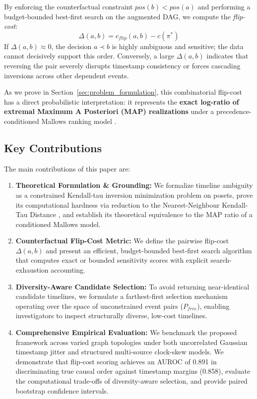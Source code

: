\documentclass[journal]{IEEEtran}
\begin{document}
By enforcing the counterfactual constraint $pos(b) < pos(a)$ and performing a budget-bounded best-first search on the augmented DAG, we compute the \emph{flip-cost}:
\begin{equation}
\Delta(a, b) = c_{flip}(a, b) - c(\pi^*)
\end{equation}
If $\Delta(a, b) \approx 0$, the decision $a \prec b$ is highly ambiguous and sensitive; the data cannot decisively support this order. Conversely, a large $\Delta(a, b)$ indicates that reversing the pair severely disrupts timestamp consistency or forces cascading inversions across other dependent events.

As we prove in Section~\ref{sec:problem_formulation}, this combinatorial flip-cost has a direct probabilistic interpretation: it represents the \textbf{exact log-ratio of extremal Maximum A Posteriori (MAP) realizations} under a precedence-conditioned Mallows ranking model \cite{Lu2011}.

\subsection{Key Contributions}
The main contributions of this paper are:
\begin{enumerate}
    \item \textbf{Theoretical Formulation \& Grounding:} We formalize timeline ambiguity as a constrained Kendall-tau inversion minimization problem on posets, prove its computational hardness via reduction to the Nearest-Neighbour Kendall-Tau Distance \cite{Brandenburg2011}, and establish its theoretical equivalence to the MAP ratio of a conditioned Mallows model.
    \item \textbf{Counterfactual Flip-Cost Metric:} We define the pairwise flip-cost $\Delta(a, b)$ and present an efficient, budget-bounded best-first search algorithm that computes exact or bounded sensitivity scores with explicit search-exhaustion accounting.
    \item \textbf{Diversity-Aware Candidate Selection:} To avoid returning near-identical candidate timelines, we formulate a farthest-first selection mechanism operating over the space of unconstrained event pairs ($P_{free}$), enabling investigators to inspect structurally diverse, low-cost timelines.
    \item \textbf{Comprehensive Empirical Evaluation:} We benchmark the proposed framework across varied graph topologies under both uncorrelated Gaussian timestamp jitter and structured multi-source clock-skew models. We demonstrate that flip-cost scoring achieves an AUROC of 0.891 in discriminating true causal order against timestamp margins (0.858), evaluate the computational trade-offs of diversity-aware selection, and provide paired bootstrap confidence intervals.
\end{enumerate}
\end{document}
